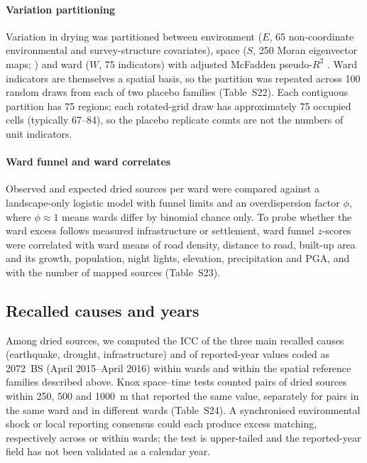 \documentclass[preprint,12pt,authoryear]{elsarticle}
\begin{document}
\paragraph{Variation partitioning} Variation in drying was partitioned between environment ($E$, 65 non-coordinate environmental and survey-structure covariates), space ($S$, 250 Moran eigenvector maps; \citealp{borcard2002allscale, dray2006spatial}) and ward ($W$, 75 indicators) with adjusted McFadden pseudo-$R^2$ \citep{peresneto2006variation}. Ward indicators are themselves a spatial basis, so the partition was repeated across 100 random draws from each of two placebo families (Table~S22). Each contiguous partition has 75 regions; each rotated-grid draw has approximately 75 occupied cells (typically 67--84), so the placebo replicate counts are not the numbers of unit indicators.
\paragraph{Ward funnel and ward correlates} Observed and expected dried sources per ward were compared against a landscape-only logistic model with funnel limits \citep{spiegelhalter2005funnel} and an overdispersion factor $\phi$, where $\phi \approx 1$ means wards differ by binomial chance only. To probe whether the ward excess follows measured infrastructure or settlement, ward funnel $z$-scores were correlated with ward means of road density, distance to road, built-up area and its growth, population, night lights, elevation, precipitation and PGA, and with the number of mapped sources (Table~S23).

\subsection{Recalled causes and years}
Among dried sources, we computed the ICC of the three main recalled causes (earthquake, drought, infrastructure) and of reported-year values coded as 2072~BS (April 2015--April 2016) within wards and within the spatial reference families described above. Knox space--time tests \citep{knox1964detection} counted pairs of dried sources within 250, 500 and \SI{1000}{\metre} that reported the same value, separately for pairs in the same ward and in different wards (Table~S24). A synchronised environmental shock or local reporting consensus could each produce excess matching, respectively across or within wards; the test is upper-tailed and the reported-year field has not been validated as a calendar year.
\end{document}
